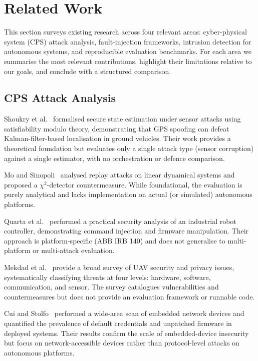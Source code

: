 \section{Related Work} \label{sec:related}

This section surveys existing research across four relevant areas: cyber-physical system (CPS) attack analysis, fault-injection frameworks, intrusion detection for autonomous systems, and reproducible evaluation benchmarks.
For each area we summarise the most relevant contributions, highlight their limitations relative to our goals, and conclude with a structured comparison.

\subsection{CPS Attack Analysis}

Shoukry et al.~\cite{shoukry2017safecontrol} formalised secure state estimation under sensor attacks using satisfiability modulo theory, demonstrating that GPS spoofing can defeat Kalman-filter-based localisation in ground vehicles.
Their work provides a theoretical foundation but evaluates only a single attack type (sensor corruption) against a single estimator, with no orchestration or defence comparison.

Mo and Sinopoli~\cite{mo2009replay} analysed replay attacks on linear dynamical systems and proposed a $\chi^2$-detector countermeasure.
While foundational, the evaluation is purely analytical and lacks implementation on actual (or simulated) autonomous platforms.

Quarta et al.~\cite{quarta2017industrialrobot} performed a practical security analysis of an industrial robot controller, demonstrating command injection and firmware manipulation.
Their approach is platform-specific (ABB IRB 140) and does not generalise to multi-platform or multi-attack evaluation.

Mekdad et al.~\cite{mekdad2023uavsecurity} provide a broad survey of UAV security and privacy issues, systematically classifying threats at four levels: hardware, software, communication, and sensor.
The survey catalogues vulnerabilities and countermeasures but does not provide an evaluation framework or runnable code.

Cui and Stolfo~\cite{cui2010embedded} performed a wide-area scan of embedded network devices and quantified the prevalence of default credentials and unpatched firmware in deployed systems.
Their results confirm the scale of embedded-device insecurity but focus on network-accessible devices rather than protocol-level attacks on autonomous platforms.

